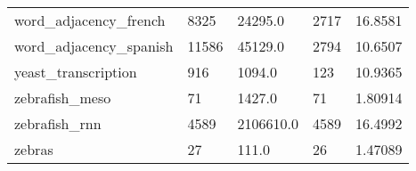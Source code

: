 \begin{longtable}{lllll}
 word\_adjacency\_french                              & 8325       & 24295.0     & 2717  & 16.8581    \\
 word\_adjacency\_spanish                             & 11586      & 45129.0     & 2794  & 10.6507    \\
 yeast\_transcription                                & 916        & 1094.0      & 123   & 10.9365    \\
 zebrafish\_meso                                     & 71         & 1427.0      & 71    & 1.80914    \\
 zebrafish\_rnn                                      & 4589       & 2106610.0   & 4589  & 16.4992    \\
 zebras                                             & 27         & 111.0       & 26    & 1.47089    \\
\hline
\end{longtable}